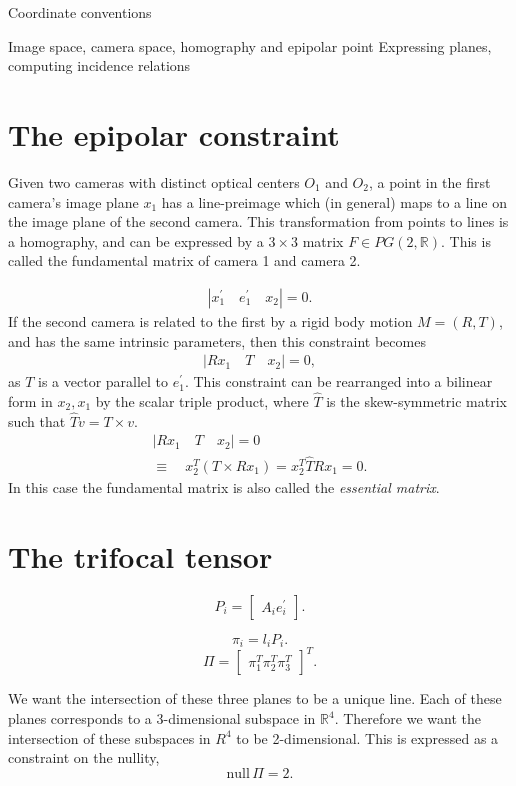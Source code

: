 \documentclass{article}
\begin{document}
Coordinate conventions

Image space, camera space, homography and epipolar point
Expressing planes, computing incidence relations


\section{The epipolar constraint}

Given two cameras with distinct optical centers $O_1$ and $O_2$,
a point in the first camera's image plane $x_1$ has a line-preimage which (in general) maps to a line
on the image plane of the second camera. This transformation from points to lines is a homography,
and can be expressed by a $3 \times 3$ matrix $F \in PG(2, \mathbb{R})$. This is called the fundamental matrix of
camera 1 and camera 2.

\begin{align*}
    \left| x^\prime_1\quad e^\prime_1\quad x_2 \right| = 0.
\end{align*}
If the second camera is related to the first by a rigid body motion $M = (R, T)$, and has the same intrinsic parameters, then
this constraint becomes
\begin{align*}
    \left| Rx_1\quad T\quad x_2\right| = 0,
\end{align*}
as $T$ is a vector parallel to $e^\prime_1$.
This constraint can be rearranged into a bilinear form in $x_2, x_1$ by
the scalar triple product, where $\hat{T}$ is the skew-symmetric matrix such that $\hat{T} v = T\times v$.
\begin{align*}
    \left| Rx_1\quad T\quad x_2\right| = 0 \\
    \equiv\quad x_2^T\left(T\times Rx_1\right) = x_2^T \hat{T} R x_1 = 0.
\end{align*}
In this case the fundamental matrix is also called the \textit{essential matrix}.

\section{The trifocal tensor}

$$P_i = \begin{bmatrix} A_i e_i^\prime \end{bmatrix}.$$

$$\pi_i = l_i P_i.$$
$$\Pi = \begin{bmatrix} \pi_1^T \pi_2^T \pi_3^T \end{bmatrix}^T.$$

We want the intersection of these three planes to be a unique line.
Each of these planes corresponds to a 3-dimensional subspace in $\mathbb{R}^4$.
Therefore we want the intersection of these subspaces in $R^4$ to be 2-dimensional.
This is expressed as a constraint on the nullity,
$$\text{null}\, \Pi = 2.$$
\end{document}
